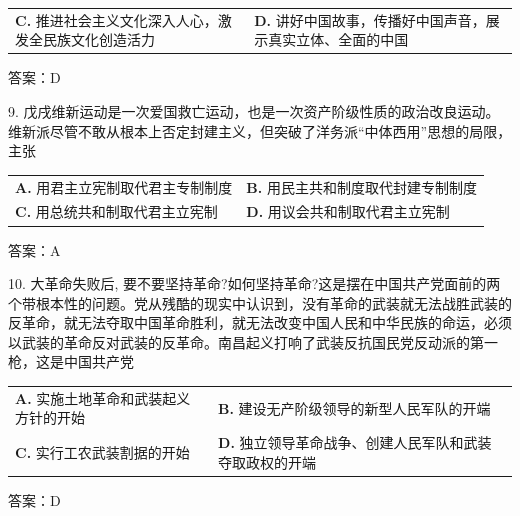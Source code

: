 \documentclass[UTF8,11pt]{ctexart}
\begin{document}
\begin{center}\begin{tabular}{>{\raggedright\arraybackslash}p{\dimexpr(\linewidth-4\tabcolsep)/2\relax}>{\raggedright\arraybackslash}p{\dimexpr(\linewidth-4\tabcolsep)/2\relax}}
\textbf{C.} 推进社会主义文化深入人心，激发全民族文化创造活力 & \textbf{D.} 讲好中国故事，传播好中国声音，展示真实立体、全面的中国\\[.35em]\end{tabular}\end{center}

答案：D


9. 戊戌维新运动是一次爱国救亡运动，也是一次资产阶级性质的政治改良运动。维新派尽管不敢从根本上否定封建主义，但突破了洋务派“中体西用”思想的局限，主张


\begin{center}\begin{tabular}{>{\raggedright\arraybackslash}p{\dimexpr(\linewidth-4\tabcolsep)/2\relax}>{\raggedright\arraybackslash}p{\dimexpr(\linewidth-4\tabcolsep)/2\relax}}
\textbf{A.} 用君主立宪制取代君主专制制度 & \textbf{B.} 用民主共和制度取代封建专制制度\\[.35em]
\textbf{C.} 用总统共和制取代君主立宪制 & \textbf{D.} 用议会共和制取代君主立宪制\\[.35em]\end{tabular}\end{center}

答案：A


10. 大革命失败后, 要不要坚持革命?如何坚持革命?这是摆在中国共产党面前的两个带根本性的问题。党从残酷的现实中认识到，没有革命的武装就无法战胜武装的反革命，就无法夺取中国革命胜利，就无法改变中国人民和中华民族的命运，必须以武装的革命反对武装的反革命。南昌起义打响了武装反抗国民党反动派的第一枪，这是中国共产党


\begin{center}\begin{tabular}{>{\raggedright\arraybackslash}p{\dimexpr(\linewidth-4\tabcolsep)/2\relax}>{\raggedright\arraybackslash}p{\dimexpr(\linewidth-4\tabcolsep)/2\relax}}
\textbf{A.} 实施土地革命和武装起义方针的开始 & \textbf{B.} 建设无产阶级领导的新型人民军队的开端\\[.35em]
\textbf{C.} 实行工农武装割据的开始 & \textbf{D.} 独立领导革命战争、创建人民军队和武装夺取政权的开端\\[.35em]\end{tabular}\end{center}

答案：D
\end{document}
